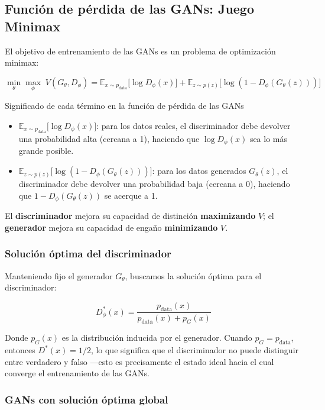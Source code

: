 \subsection{Función de pérdida de las GANs: Juego Minimax}

El objetivo de entrenamiento de las GANs es un problema de optimización minimax:

$$\min_\theta \max_\phi \; V(G_\theta, D_\phi) = \mathbb{E}_{x \sim p_{\text{data}}} {[}\log D_\phi(x){]} + \mathbb{E}_{z \sim p(z)} {[}\log(1 - D_\phi(G_\theta(z))){]}$$

\begin{importantbox}{Significado de cada término en la función de pérdida de las GANs}
\begin{itemize}
    \item $\mathbb{E}_{x \sim p_{\text{data}}} {[}\log D_\phi(x){]}$: para los datos reales, el discriminador debe devolver una probabilidad alta (cercana a 1), haciendo que $\log D_\phi(x)$ sea lo más grande posible.
    \item $\mathbb{E}_{z \sim p(z)} {[}\log(1 - D_\phi(G_\theta(z))){]}$: para los datos generados $G_\theta(z)$, el discriminador debe devolver una probabilidad baja (cercana a 0), haciendo que $1 - D_\phi(G_\theta(z))$ se acerque a 1.
\end{itemize}
El \textbf{discriminador} mejora su capacidad de distinción \textbf{maximizando} $V$; el \textbf{generador} mejora su capacidad de engaño \textbf{minimizando} $V$.
\end{importantbox}

\subsubsection{Solución óptima del discriminador}

Manteniendo fijo el generador $G_\theta$, buscamos la solución óptima para el discriminador:

$$D^*_\phi(x) = \frac{p_{\text{data}}(x)}{p_{\text{data}}(x) + p_G(x)}$$

Donde $p_G(x)$ es la distribución inducida por el generador. Cuando $p_G = p_{\text{data}}$, entonces $D^*(x) = 1/2$, lo que significa que el discriminador no puede distinguir entre verdadero y falso —esto es precisamente el estado ideal hacia el cual converge el entrenamiento de las GANs.

\subsubsection{GANs con solución óptima global}

